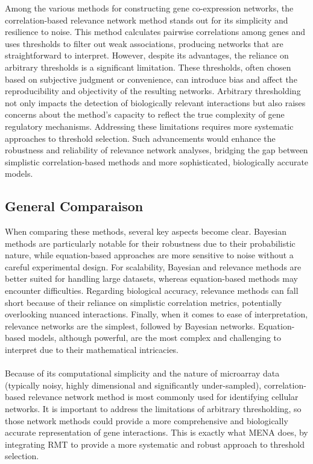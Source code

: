 Among the various methods for constructing gene co-expression networks, the correlation-based relevance network method stands out for its simplicity and resilience to noise\cite{butte_discovering_2000}.
This method calculates pairwise correlations among genes and uses thresholds to filter out weak associations, producing networks that are straightforward to interpret\cite{schmitt_elucidation_2004}.
However, despite its advantages, the reliance on arbitrary thresholds is a significant limitation.
These thresholds, often chosen based on subjective judgment or convenience, can introduce bias and affect the reproducibility and objectivity of the resulting networks\cite{oldham_conservation_2006}.
Arbitrary thresholding not only impacts the detection of biologically relevant interactions but also raises concerns about the method’s capacity to reflect the true complexity of gene regulatory mechanisms\cite{gardner_reverse-engineering_2005}.
Addressing these limitations requires more systematic approaches to threshold selection.
Such advancements would enhance the robustness and reliability of relevance network analyses, bridging the gap between simplistic correlation-based methods and more sophisticated, biologically accurate models.

\subsection{General Comparaison}\label{subsec:general-comparaison}

When comparing these methods, several key aspects become clear.
Bayesian methods are particularly notable for their robustness due to their probabilistic nature, while equation-based approaches are more sensitive to noise without a careful experimental design.
For scalability, Bayesian and relevance methods are better suited for handling large datasets, whereas equation-based methods may encounter difficulties.
Regarding biological accuracy, relevance methods can fall short because of their reliance on simplistic correlation metrics, potentially overlooking nuanced interactions.
Finally, when it comes to ease of interpretation, relevance networks are the simplest, followed by Bayesian networks.
Equation-based models, although powerful, are the most complex and challenging to interpret due to their mathematical intricacies.
\\\\
Because of its computational simplicity and the nature of microarray data (typically noisy, highly dimensional and significantly under-sampled)\cite{gardner_reverse-engineering_2005}, correlation-based relevance network method is most commonly used for identifying cellular networks.
It is important to address the limitations of arbitrary thresholding, so those network methods could provide a more comprehensive and biologically accurate representation of gene interactions.
This is exactly what MENA does, by integrating RMT to provide a more systematic and robust approach to threshold selection.